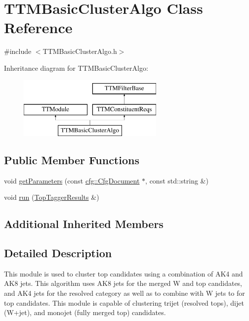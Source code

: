 \hypertarget{classTTMBasicClusterAlgo}{\section{T\-T\-M\-Basic\-Cluster\-Algo Class Reference}
\label{classTTMBasicClusterAlgo}
}


{\ttfamily \#include $<$T\-T\-M\-Basic\-Cluster\-Algo.\-h$>$}

Inheritance diagram for T\-T\-M\-Basic\-Cluster\-Algo\-:\begin{figure}[H]
\begin{center}
\leavevmode
\includegraphics[height=3.000000cm]{classTTMBasicClusterAlgo}
\end{center}
\end{figure}
\subsection*{Public Member Functions}
\begin{DoxyCompactItemize}
\item 
void \hyperlink{classTTMBasicClusterAlgo_afdbe472d26a753268dac63d897169299}{get\-Parameters} (const \hyperlink{classcfg_1_1CfgDocument}{cfg\-::\-Cfg\-Document} $\ast$, const std\-::string \&)
\item 
void \hyperlink{classTTMBasicClusterAlgo_ae1d464bf1db5762318766d109c843932}{run} (\hyperlink{classTopTaggerResults}{Top\-Tagger\-Results} \&)
\end{DoxyCompactItemize}
\subsection*{Additional Inherited Members}


\subsection{Detailed Description}
This module is used to cluster top candidates using a combination of A\-K4 and A\-K8 jets. This algorithm uses A\-K8 jets for the merged W and top candidates, and A\-K4 jets for the resolved category as well as to combine with W jets to for top candidates. This module is capable of clustering trijet (resolved tops), dijet (W+jet), and monojet (fully merged top) candidates.


